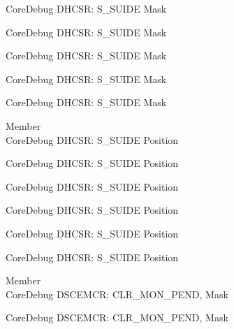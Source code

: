 \begin{DoxyRefList}
\label{deprecated__deprecated000467}%
%
Core\+Debug DHCSR\+: S\+\_\+\+SUIDE Mask 

\label{deprecated__deprecated000569}%
%
Core\+Debug DHCSR\+: S\+\_\+\+SUIDE Mask 

\label{deprecated__deprecated000675}%
%
Core\+Debug DHCSR\+: S\+\_\+\+SUIDE Mask 

\label{deprecated__deprecated001126}%
%
Core\+Debug DHCSR\+: S\+\_\+\+SUIDE Mask 

\label{deprecated__deprecated001228}%
%
Core\+Debug DHCSR\+: S\+\_\+\+SUIDE Mask  
\item[Member \doxylink{group___c_m_s_i_s___s_c_b_gacff001d7e8c9665a1dc91018f2505d3d}{Core\+Debug\+\_\+\+DHCSR\+\_\+\+S\+\_\+\+SUIDE\+\_\+\+Pos} ]\hfill \\
\label{deprecated__deprecated000015}%
%
Core\+Debug DHCSR\+: S\+\_\+\+SUIDE Position 

\label{deprecated__deprecated000466}%
%
Core\+Debug DHCSR\+: S\+\_\+\+SUIDE Position 

\label{deprecated__deprecated000568}%
%
Core\+Debug DHCSR\+: S\+\_\+\+SUIDE Position 

\label{deprecated__deprecated000674}%
%
Core\+Debug DHCSR\+: S\+\_\+\+SUIDE Position 

\label{deprecated__deprecated001125}%
%
Core\+Debug DHCSR\+: S\+\_\+\+SUIDE Position 

\label{deprecated__deprecated001227}%
%
Core\+Debug DHCSR\+: S\+\_\+\+SUIDE Position  
\item[Member \doxylink{group___c_m_s_i_s___s_c_b_gacfb17801664286ab627a094d5fb3da20}{Core\+Debug\+\_\+\+DSCEMCR\+\_\+\+CLR\+\_\+\+MON\+\_\+\+PEND\+\_\+\+Msk} ]\hfill \\
\label{deprecated__deprecated000074}%
%
Core\+Debug DSCEMCR\+: CLR\+\_\+\+MON\+\_\+\+PEND, Mask 

\label{deprecated__deprecated000525}%
%
Core\+Debug DSCEMCR\+: CLR\+\_\+\+MON\+\_\+\+PEND, Mask 


\end{DoxyRefList}
